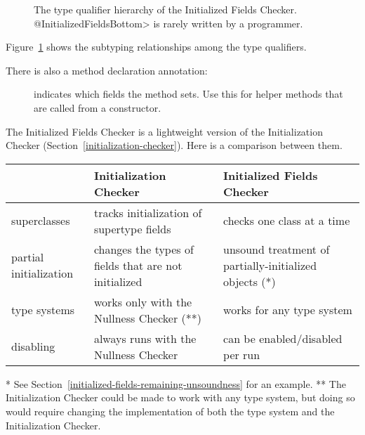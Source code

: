 \begin{figure}
\caption{The type qualifier hierarchy of the Initialized Fields Checker.
\<@InitializedFieldsBottom> is rarely written by a programmer.}
\label{fig-initialized-fields-hierarchy}
\end{figure}

Figure~\ref{fig-initialized-fields-hierarchy} shows the subtyping
relationships among the type qualifiers.

There is also a method declaration annotation:

\begin{description}
\item[]
  indicates which fields the method sets.  Use this for helper methods that
  are called from a constructor.
\end{description}



The Initialized Fields Checker is a lightweight version of the  Initialization Checker
(Section~\ref{initialization-checker}).  Here is a comparison between them.

\noindent
\begin{small}
\begin{tabular}{| l | l | l |}
 \hline
 & Initialization Checker & Initialized Fields Checker
 \\ \hline
 superclasses
 & tracks initialization of supertype fields
 & checks one class at a time
 \\
 partial initialization
 & changes the types of fields that are not initialized
 & unsound treatment of partially-initialized objects (*)
 \\
 type systems
 & works only with the Nullness Checker (**)
 & works for any type system
 \\
 disabling
 & always runs with the Nullness Checker
 & can be enabled/disabled per run
 \\
 \hline
\end{tabular}

\noindent
* See Section~\ref{initialized-fields-remaining-unsoundness} for an example.
\newline
** The Initialization Checker could be made to work with any type system, but
doing so would require changing the implementation of both the type system and
the Initialization Checker.
\end{small}


